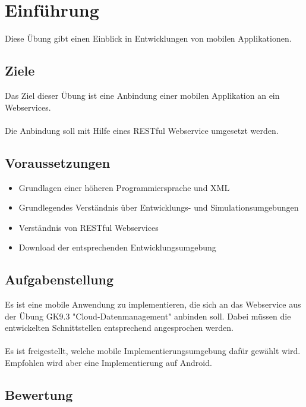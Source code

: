 
\section{Einführung}

Diese Übung gibt einen Einblick in Entwicklungen von mobilen Applikationen.

\subsection{Ziele}
Das Ziel dieser Übung ist eine Anbindung einer mobilen Applikation an ein Webservices. 
\\\\
Die Anbindung soll mit Hilfe eines RESTful Webservice umgesetzt werden.

\subsection{Voraussetzungen}

\begin{itemize}
	\item Grundlagen einer höheren Programmiersprache und XML
	\item Grundlegendes Verständnis über Entwicklungs- und Simulationsumgebungen
	\item Verständnis von RESTful Webservices
	\item Download der entsprechenden Entwicklungsumgebung
\end{itemize}

\subsection{Aufgabenstellung}
Es ist eine mobile Anwendung zu implementieren, die sich an das Webservice aus der Übung GK9.3 "Cloud-Datenmanagement" anbinden soll. Dabei müssen die entwickelten Schnittstellen entsprechend angesprochen werden.
\\\\
Es ist freigestellt, welche mobile Implementierungsumgebung dafür gewählt wird. Empfohlen wird aber eine Implementierung auf Android.

\subsection{Bewertung}

